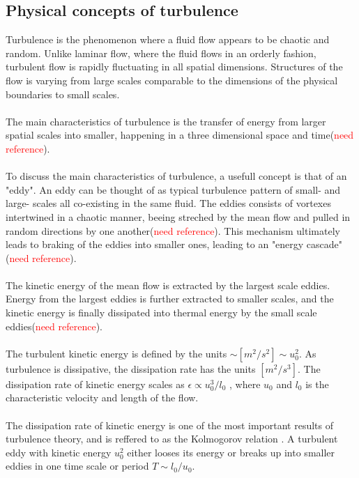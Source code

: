 \documentclass[a4paper, 12pt]{report}
\begin{document}
\subsection{Physical concepts of turbulence}
Turbulence is the phenomenon where a fluid flow appears to be chaotic and random. Unlike laminar flow, where the fluid flows in an orderly fashion, turbulent flow is rapidly fluctuating in all spatial dimensions. Structures of the flow is varying from large scales comparable to the dimensions of the physical boundaries to small scales.\\
\\
The main characteristics of turbulence is the transfer of energy from larger spatial scales into smaller, happening in a three dimensional space and time(\textcolor{red}{need reference}).\\
\\
 To discuss the main characteristics of turbulence, a usefull concept is that of an "eddy". An eddy can be thought of as typical turbulence pattern of small- and large- scales all co-existing in the same fluid. The eddies consists of vortexes intertwined in a chaotic manner, beeing streched by the mean flow and pulled in random directions by one another(\textcolor{red}{need reference}). This mechanism ultimately leads to braking of the eddies into smaller ones, leading to an "energy cascade"(\textcolor{red}{need reference}).\\
\\
The kinetic energy of the mean flow is extracted by the largest scale eddies. Energy from the largest eddies is further extracted to smaller scales, and the kinetic energy is finally dissipated into thermal energy by the small scale eddies(\textcolor{red}{need reference}).\\
\\
The turbulent kinetic energy is defined by the units $\sim [m^2/s^2] \sim u_0^2$. As turbulence is dissipative, the dissipation rate has the units $[m^2/s^3]$. The dissipation rate of kinetic energy scales as $\epsilon \propto u_0^3/l_0$ \cite{Turbulence}, where $u_0$ and $l_0$ is the characteristic velocity and length of the flow.\\
\\
The dissipation rate of kinetic energy is one of the most important results of turbulence theory, and is reffered to as the Kolmogorov relation \cite{Turbulence}. A turbulent eddy with kinetic energy $u_0^2$ either looses its energy or breaks up into smaller eddies in one time scale or period $T \sim l_0/u_0$.\\
\end{document}
